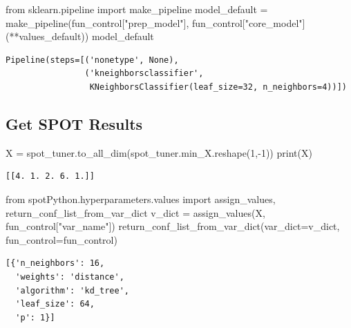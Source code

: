 \documentclass[
  letterpaper,
  DIV=11,
  numbers=noendperiod]{scrreprt}
\newenvironment{Shaded}{\begin{snugshade}}{\end{snugshade}}
\newcommand{\BuiltInTok}[1]{\textcolor[rgb]{0.00,0.23,0.31}{#1}}
\newcommand{\DecValTok}[1]{\textcolor[rgb]{0.68,0.00,0.00}{#1}}
\newcommand{\ImportTok}[1]{\textcolor[rgb]{0.00,0.46,0.62}{#1}}
\newcommand{\NormalTok}[1]{\textcolor[rgb]{0.00,0.23,0.31}{#1}}
\newcommand{\OperatorTok}[1]{\textcolor[rgb]{0.37,0.37,0.37}{#1}}
\newcommand{\StringTok}[1]{\textcolor[rgb]{0.13,0.47,0.30}{#1}}
\begin{document}
\begin{Shaded}
\begin{Highlighting}[]
\ImportTok{from}\NormalTok{ sklearn.pipeline }\ImportTok{import}\NormalTok{ make\_pipeline}
\NormalTok{model\_default }\OperatorTok{=}\NormalTok{ make\_pipeline(fun\_control[}\StringTok{"prep\_model"}\NormalTok{], fun\_control[}\StringTok{"core\_model"}\NormalTok{](}\OperatorTok{**}\NormalTok{values\_default))}
\NormalTok{model\_default}
\end{Highlighting}
\end{Shaded}

\begin{verbatim}
Pipeline(steps=[('nonetype', None),
                ('kneighborsclassifier',
                 KNeighborsClassifier(leaf_size=32, n_neighbors=4))])
\end{verbatim}

\hypertarget{get-spot-results-5}{%
\subsection{Get SPOT Results}\label{get-spot-results-5}}

\begin{Shaded}
\begin{Highlighting}[]
\NormalTok{X }\OperatorTok{=}\NormalTok{ spot\_tuner.to\_all\_dim(spot\_tuner.min\_X.reshape(}\DecValTok{1}\NormalTok{,}\OperatorTok{{-}}\DecValTok{1}\NormalTok{))}
\BuiltInTok{print}\NormalTok{(X)}
\end{Highlighting}
\end{Shaded}

\begin{verbatim}
[[4. 1. 2. 6. 1.]]
\end{verbatim}

\begin{Shaded}
\begin{Highlighting}[]
\ImportTok{from}\NormalTok{ spotPython.hyperparameters.values }\ImportTok{import}\NormalTok{ assign\_values, return\_conf\_list\_from\_var\_dict}
\NormalTok{v\_dict }\OperatorTok{=}\NormalTok{ assign\_values(X, fun\_control[}\StringTok{"var\_name"}\NormalTok{])}
\NormalTok{return\_conf\_list\_from\_var\_dict(var\_dict}\OperatorTok{=}\NormalTok{v\_dict, fun\_control}\OperatorTok{=}\NormalTok{fun\_control)}
\end{Highlighting}
\end{Shaded}

\begin{verbatim}
[{'n_neighbors': 16,
  'weights': 'distance',
  'algorithm': 'kd_tree',
  'leaf_size': 64,
  'p': 1}]
\end{verbatim}
\end{document}
